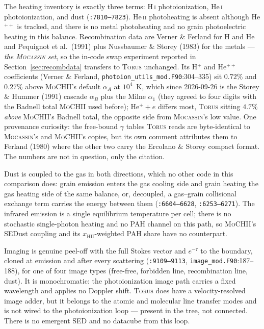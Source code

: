 \documentclass[english,a4paper]{my_memo}
\newcommand{\code}[1]{\texttt{#1}}
\newcommand{\MoCHII}{\textsc{MoCHII}}
\newcommand{\Torus}{\textsc{Torus}}
\newcommand{\Mocassin}{\textsc{Mocassin}}
\newcommand{\HI}{H\,\textsc{i}}
\newcommand{\HeI}{He\,\textsc{i}}
\newcommand{\HeII}{He\,\textsc{ii}}
\begin{document}
The heating inventory is exactly three terms: \HI{} photoionization, \HeI{}
photoionization, and dust (\code{:7810--7823}).  \HeII{} photoheating is
absent although He$^{++}$ is tracked, and there is no metal photoheating and
no grain photoelectric heating in this balance.  Recombination data are
Verner \& Ferland for H and He and Pequignot et al.\ (1991) plus Nussbaumer
\& Storey (1983) for the metals --- \emph{the \Mocassin{} set}, so the
in-code swap experiment reported in Section~\ref{sec:recombdata} transfers to
\Torus{} unchanged.  Its H$^+$ and He$^{++}$ coefficients (Verner \&
Ferland, \code{photoion\_utils\_mod.F90}:304--335) sit $0.72\%$ and
$0.27\%$ above \MoCHII{}'s default $\alpha_A$ at $10^4$~K, which since
2026-09-26 is the Storey \& Hummer (1991) cascade $\alpha_B$ plus the Milne
$\alpha_1$ (they agreed to four digits with the Badnell total \MoCHII{} used
before); He$^+ + e$ differs most, \Torus{} sitting $4.7\%$ \emph{above}
\MoCHII{}'s Badnell total, the opposite side from \Mocassin{}'s low value.  One provenance curiosity: the free-bound $\gamma$
tables \Torus{} reads are byte-identical to \Mocassin{}'s and \MoCHII{}'s
copies, but its own comment attributes them to Ferland (1980) where the other
two carry the Ercolano \& Storey compact format.  The numbers are not in
question, only the citation.

Dust is coupled to the gas in both directions, which no other code in this
comparison does: grain emission enters the gas cooling side and grain heating
the gas heating side of the same balance, or, decoupled, a gas--grain
collisional exchange term carries the energy between them
(\code{:6604--6628}, \code{:6253--6271}).  The infrared emission is a single
equilibrium temperature per cell; there is no stochastic single-photon
heating and no PAH channel on this path, so \MoCHII{}'s SEDust coupling and
its $x_{\mathrm{HII}}$-weighted PAH share have no counterpart.

Imaging is genuine peel-off with the full Stokes vector and $e^{-\tau}$ to
the boundary, cloned at emission and after every scattering
(\code{:9109--9113}, \code{image\_mod.F90}:187--188), for one of four image
types (free-free, forbidden line, recombination line, dust).  It is
monochromatic: the photoionization image path carries a fixed wavelength and
applies no Doppler shift.  \Torus{} does have a velocity-resolved image
adder, but it belongs to the atomic and molecular line transfer modes and is
not wired to the photoionization loop --- present in the tree, not connected.
There is no emergent SED and no datacube from this loop.
\end{document}
